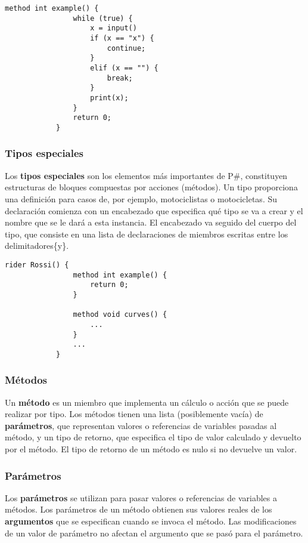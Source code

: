 		\begin{lstlisting}[language={PySharp}]
			method int example() {
				while (true) {
					x = input()
					if (x == "x") {
						continue;
					}
					elif (x == "") {
						break;
					}
					print(x);
				}
				return 0;
			}
		\end{lstlisting}
		
	\subsubsection{Tipos especiales}
		Los \textbf{tipos especiales} son los elementos más importantes de P\#, constituyen estructuras de bloques compuestas por acciones (métodos). Un tipo proporciona una definición para casos de, por ejemplo, motociclistas o motocicletas. Su declaración comienza con un encabezado que especifica qué tipo se va a crear y el nombre que se le dará a esta instancia. El encabezado va seguido del cuerpo del tipo, que consiste en una lista de declaraciones de miembros escritas entre los delimitadores\{y\}.
		
		\begin{lstlisting}[language={PySharp}]
			rider Rossi() {
				method int example() {    
					return 0;
				}
				
				method void curves() {    
					...
				}
				...
			}
		\end{lstlisting}
	\subsubsection{Métodos}
		Un \textbf{método} es un miembro que implementa un cálculo o acción que se puede realizar por tipo. Los métodos tienen una lista (posiblemente vacía) de \textbf{parámetros}, que representan valores o referencias de variables pasadas al método, y un tipo de retorno, que especifica el tipo de valor calculado y devuelto por el método. El tipo de retorno de un método es nulo si no devuelve un valor.
		
	\subsubsection{Parámetros}
		Los \textbf{parámetros} se utilizan para pasar valores o referencias de variables a métodos. Los parámetros de un método obtienen sus valores reales de los \textbf{argumentos} que se especifican cuando se invoca el método. Las modificaciones de un valor de parámetro no afectan el argumento que se pasó para el parámetro.
			
